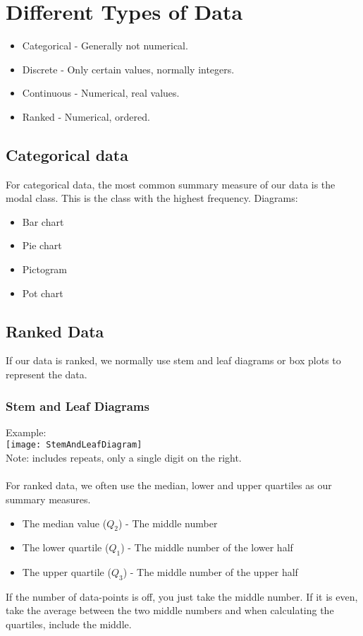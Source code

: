 \documentclass[class=article, crop=false]{standalone}
\begin{document}
\section*{Different Types of Data}
\begin{itemize}
	\item Categorical - Generally not numerical.
	\item Discrete - Only certain values, normally integers. 
	\item Continuous - Numerical, real values.
	\item Ranked - Numerical, ordered.
\end{itemize}

\subsection*{Categorical data}
For categorical data, the most common summary measure of our data is the modal class. This is the class with the highest frequency. 
Diagrams:
\begin{itemize}
	\item Bar chart 
	\item Pie chart
	\item Pictogram 
	\item Pot chart 
\end{itemize} 

\subsection*{Ranked Data}
If our data is ranked, we normally use stem and leaf diagrams or box plots to represent the data. 

\subsubsection*{Stem and Leaf Diagrams} 
Example:\\
\texttt{[image: StemAndLeafDiagram]}\\
Note: includes repeats, only a single digit on the right.\\\\

For ranked data, we often use the median, lower and upper quartiles as our summary measures. 
\begin{itemize}
	\item The median value ($Q_2$) - The middle number 
	\item The lower quartile ($Q_1$) - The middle number of the lower half
	\item The upper quartile ($Q_3$) - The middle number of the upper half
\end{itemize}
If the number of data-points is off, you just take the middle number. If it is even, take the average between the two middle numbers and when calculating the quartiles, include the middle.
\end{document}
